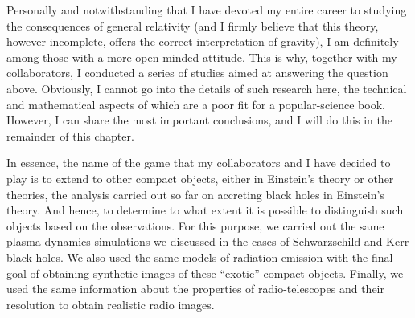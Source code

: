 Personally and notwithstanding that I have devoted my entire career to studying the
consequences of general relativity (and I firmly believe that this theory, however
incomplete, offers the correct interpretation of gravity), I am definitely among those
with a more open-minded attitude. This is why, together with my collaborators, I
conducted a series of studies aimed at answering the question above. Obviously, I cannot
go into the details of such research here, the technical and mathematical aspects of
which are a poor fit for a popular-science book. However, I can share the most important
conclusions, and I will do this in the remainder of this chapter.

In essence, the name of the game that my collaborators and I have decided to play is to
extend to other compact objects, either in Einstein's theory or other theories, the
analysis carried out so far on accreting black holes in Einstein's theory. And hence, to
determine to what extent it is possible to distinguish such objects based on the
observations. For this purpose, we carried out the same plasma dynamics simulations we
discussed in the cases of Schwarzschild and Kerr black holes. We also used the same
models of radiation emission with the final goal of obtaining synthetic images of these
``exotic'' compact objects. Finally, we used the same information
about the properties of radio-telescopes and their resolution to obtain realistic radio
images.


